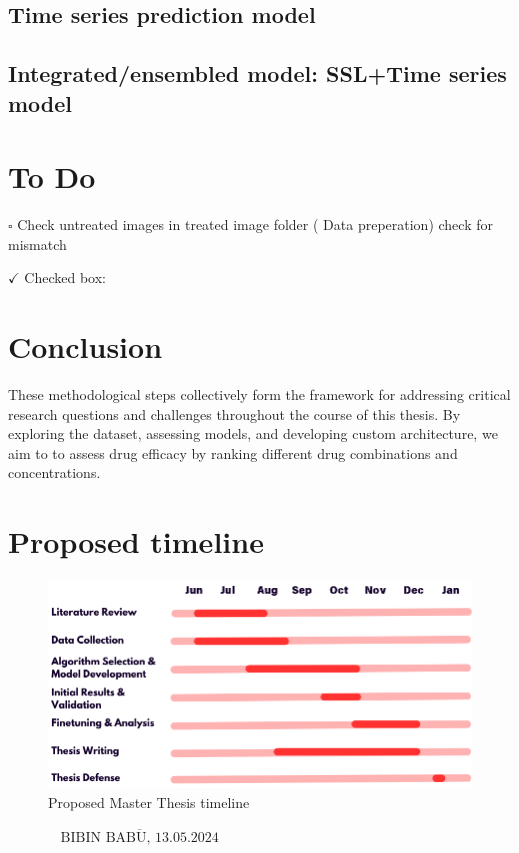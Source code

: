 \documentclass[12pt,twoside,a4paper,parskip]{scrbook} %
\def\BaAuthor{Bibin Babu}
\def\SubmitDate{13.05.2024}
\def\ShowBaAuthor{\BaAuthor}
\def\ShowBaAuthor{BIBIN BABU}
\begin{document}
\section{Time series prediction model}
\section{Integrated/ensembled model: SSL+Time series model}

\chapter{To Do}\label{ch:To Do}
$\square$ Check untreated images in treated image folder ( Data preperation) check for mismatch 

$\checkmark$ Checked box: 
\chapter{Conclusion}\label{ch:Conclusion}

These methodological steps collectively form the framework for addressing critical research questions and challenges throughout the course of this thesis. By exploring the dataset, assessing models, and developing custom architecture, we aim to to assess drug efficacy by ranking different drug combinations and concentrations.

\let\cleardoublepage\clearpage

\chapter{Proposed timeline}\label{ch:Proposed timeline}

\begin{figure}[H]
    \centering
    \includegraphics[width=0.9\linewidth]{Thesis timeline.png} %
    \caption{Proposed Master Thesis timeline}
    \label{fig:enter-label}
\end{figure}

\FloatBarrier

\printbibliography

\vspace{20pt}
\begin{flushright}
$\overline{~~~~~~~~~~~~~~~~~\mbox{\ShowBaAuthor, \SubmitDate}~~~~~~~~~~~~~~~~~}$
\end{flushright}
\end{document}
